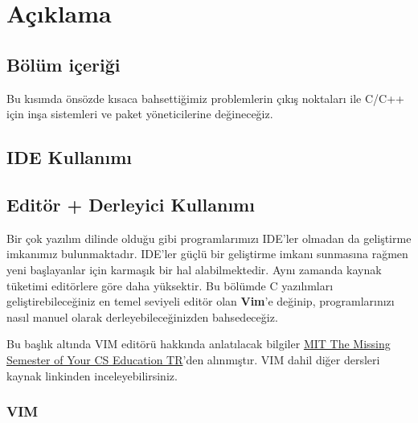 \documentclass[
]{book}
\begin{document}
\hypertarget{auxe7ux131klama}{%
\chapter{Açıklama}\label{auxe7ux131klama}}

\hypertarget{buxf6luxfcm-iuxe7eriux11fi}{%
\section*{Bölüm içeriği}\label{buxf6luxfcm-iuxe7eriux11fi}}

Bu kısımda önsözde kısaca bahsettiğimiz problemlerin çıkış noktaları ile C/C++ için inşa sistemleri ve paket yöneticilerine değineceğiz.

\hypertarget{ide-kullanux131mux131}{%
\section*{IDE Kullanımı}\label{ide-kullanux131mux131}}

\hypertarget{edituxf6r-derleyici-kullanux131mux131}{%
\section*{Editör + Derleyici Kullanımı}\label{edituxf6r-derleyici-kullanux131mux131}}

Bir çok yazılım dilinde olduğu gibi programlarımızı IDE'ler olmadan da geliştirme imkanımız bulunmaktadır. IDE'ler güçlü bir geliştirme imkanı sunmasına rağmen yeni başlayanlar için karmaşık bir hal alabilmektedir. Aynı zamanda kaynak tüketimi editörlere göre daha yüksektir. Bu bölümde C yazılımları geliştirebileceğiniz en temel seviyeli editör olan \textbf{Vim}'e değinip, programlarınızı nasıl manuel olarak derleyebileceğinizden bahsedeceğiz.

Bu başlık altında VIM editörü hakkında anlatılacak bilgiler \href{https://missing-semester-tr.github.io/}{MIT \textbar{} The Missing Semester of Your CS Education TR}'den alınmıştır. VIM dahil diğer dersleri kaynak linkinden inceleyebilirsiniz.

\hypertarget{vim}{%
\subsection*{VIM}\label{vim}}
\end{document}

